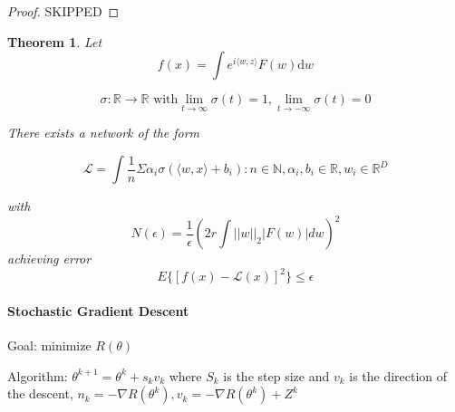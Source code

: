 \documentclass{article}
\newtheorem{theorem}{Theorem}
\theoremstyle{definition}
\theoremstyle{remark}
\begin{document}
\begin{proof}
    SKIPPED
\end{proof}

\begin{theorem}
    Let $$f(x) = \int e^{i\langle w, z \rangle}F(w)\mathrm{d}w$$

    $$\sigma: \mathbb{R} \to \mathbb{R} \text{ with} \lim_{t \to \infty}\sigma(t) = 1, \lim_{t \to -\infty} \sigma(t) = 0$$

    \textnormal{ There exists a network of the form }

    $$\mathcal{L} = \int \frac{1}{n}\Sigma\alpha_i\sigma(\langle w, x \rangle + b_i): n \in \mathbb{N}, \alpha_i, b_i \in \mathbb{R}, w_i \in \mathbb{R}^D$$

    \textnormal{ with } $$N(\epsilon) = \frac{1}{\epsilon}(2r \int ||w||_2 |F(w)|dw)^2$$ \textnormal{ achieving error } $$E\{[f(x) - \mathcal{L}(x)]^2\} \leq \epsilon$$
\end{theorem}

\paragraph{Stochastic Gradient Descent}

Goal: minimize $R(\theta)$

Algorithm: $\theta^{k+1} = \theta^k + s_kv_k$ where $S_k$ is the step size and $v_k$ is the direction of the descent, $n_k = -\nabla R(\theta^k), v_k = - \nabla R(\theta^k) + Z^k$
\end{document}

